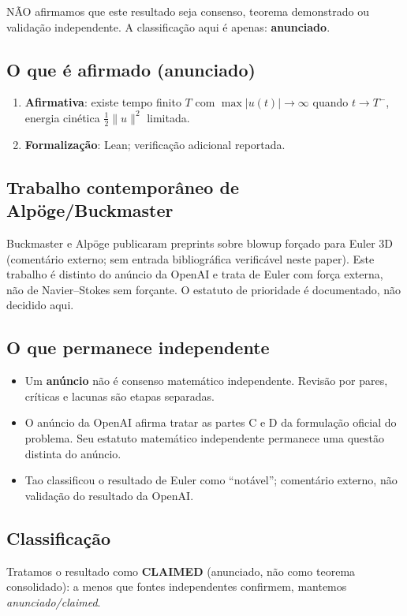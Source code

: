\documentclass[11pt,a4paper]{article}
\begin{document}
NÃO afirmamos que este resultado seja consenso,
teorema demonstrado ou validação independente. A
classificação aqui é apenas: \textbf{anunciado}.

\subsection{O que é afirmado (anunciado)}
\begin{enumerate}
\item \textbf{Afirmativa}: existe tempo finito $T$ com
  $\max|u(t)|\to\infty$ quando $t\to T^{-}$, energia
  cinética $\tfrac12\|u\|^2$ limitada.
\item \textbf{Formalização}: Lean; verificação adicional
  reportada.
\end{enumerate}

\subsection{Trabalho contemporâneo de Alpöge/Buckmaster}
Buckmaster e Alpöge publicaram preprints sobre
blowup forçado para Euler 3D (comentário externo;
sem entrada bibliográfica verificável neste paper).
Este trabalho é distinto do anúncio da OpenAI e
trata de Euler com força externa, não de Navier--Stokes
sem forçante. O estatuto de prioridade é documentado,
não decidido aqui.

\subsection{O que permanece independente}
\begin{itemize}
\item Um \textbf{anúncio} não é consenso matemático independente.
  Revisão por pares, críticas e lacunas são etapas separadas.
\item O anúncio da OpenAI afirma tratar as partes C e D
  da formulação oficial do problema. Seu estatuto
  matemático independente permanece uma questão
  distinta do anúncio.
\item Tao classificou o resultado de Euler como ``notável'';
  comentário externo, não validação do resultado da OpenAI.
\end{itemize}

\subsection{Classificação}
Tratamos o resultado como \textbf{CLAIMED} (anunciado,
não como teorema consolidado): a menos que fontes
independentes confirmem, mantemos \emph{anunciado/claimed}.
\end{document}
